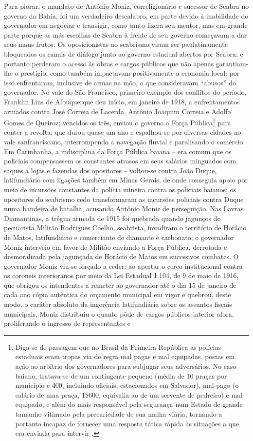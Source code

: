 Para piorar, o mandato de Antônio Moniz, correligionário e sucessor de Seabra no governo da Bahia, foi um verdadeiro descalabro, em parte devido à inabilidade do governador em negociar e transigir, como tanto fizera seu mentor, mas em grande parte porque as más escolhas de Seabra à frente de seu governo começavam a dar seus maus frutos. Os oposicionistas ao seabrismo viram ser paulatinamente bloqueados os canais de diálogo junto ao governo estadual abertos por Seabra, e portanto perderam o acesso às obras e cargos públicos que não apenas garantiam-lhe o prestígio, como também impactavam positivamente a economia local; por isso enfrentaram, inclusive de armas na mão, o que consideravam ``abusos'' do governador. No vale do São Francisco, primeiro exemplo dos conflitos do período, Franklin Lins de Albuquerque deu início, em janeiro de 1918, a enfrentamentos armados contra José Correia de Lacerda, Antônio Joaquim Correia e Adolfo Gomes de Queiroz; vencidos os três, enviou o governo a Força Pública\footnote{Diga-se de passagem que no Brasil da Primeira República as polícias estaduais eram tropas via de regra mal pagas e mal equipadas, postas em ação ao arbítrio dos governadores para subjugar seus adversários. No caso baiano, tratava-se de um contingente pequeno (média de 10 praças por município e 400, incluindo oficiais, estacionados em Salvador), mal-pago (o salário de uma praça, 1\$600, equivalia ao de um servente de pedreiro) e mal-equipado, e além do mais responsável pela segurança num Estado de grande tamanho vitimado pela precariedade de sua malha viária, tornando-a portanto incapaz de fornecer uma resposta tática rápida às situações a que era enviada para intervir \cite[pp.~46-47]{sampaio_legislativo_1985}.} para conter a revolta, que durou quase um ano e espalhou-se por diversas cidades no vale sanfranciscano, interrompendo a navegação fluvial e paralisando o comércio. Em Carinhanha, a indisciplina da Força Pública baiana -- era comum que os policiais compensassem os constantes atrasos em seus salários minguados com saques a lojas e fazendas dos opositores -- voltou-se contra João Duque, latifundiário com ligações também em Minas Gerais, de onde conseguia apoio por meio de incursões constantes da polícia mineira contra os policiais baianos; os opositores do seabrismo cedo transformaram as incursões policiais contra Duque numa bandeira de batalha, acusando Antônio Moniz de perseguição. Nas Lavras Diamantinas, a trégua armada de 1915 foi quebrada quando jagunços do pecuarista Militão Rodrigues Coelho, seabrista, invadiram o território de Horácio de Matos, latifundiário e comerciante de diamante e carbonato; o governador Moniz interveio em favor de Militão enviando a Força Pública, derrotada e desmoralizada pela jagunçada de Horácio de Matos em sucessivos combates. O governador Moniz viu-se forçado a ceder: ao apertar o cerco institucional contra os coroneis interioranos por meio da Lei Estadual 1.104, de 9 de maio de 1916, que obrigou os intendentes a remeter ao governador até o dia 15 de janeiro de cada ano cópia autêntica do orçamento municipal em vigor e quebrou, deste modo, o caráter absoluto da ingerência latifundiária sobre os assuntos fiscais municipais, Moniz distribuiu o quanto pôde de cargos públicos interior afora, proliferando o ingresso de representantes e 